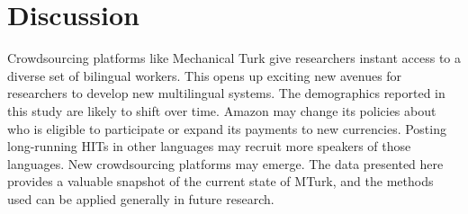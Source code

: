 \documentclass[11pt]{article}
\begin{document}
%
%
%

\section{Discussion}
Crowdsourcing platforms like Mechanical Turk give researchers instant access to a diverse set of bilingual workers.  This opens up exciting new avenues for researchers to develop new multilingual systems.   The demographics reported in this study are likely to shift over time. Amazon may change its policies about who is eligible to participate or expand its payments to new currencies.  Posting long-running HITs in other languages may recruit more speakers of those languages.  New crowdsourcing platforms may emerge. The data presented here provides a valuable snapshot of the current state of MTurk, and the methods used can be applied generally in future research. 
\end{document}
